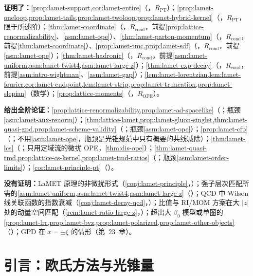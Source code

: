 \begin{tcolorbox}[enhanced,breakable,title=本章证明了什么／没有证明什么,fonttitle=\bfseries,
  colback=gray!3!white,colframe=gray!55!black,boxrule=0.6pt,arc=2pt,
  left=5pt,right=5pt,top=3pt,bottom=3pt,before skip=6pt,after skip=6pt]
\textbf{证明了：}\cref{prop:lamet-support,cor:lamet-entire}（\tagR，$R_{\mathrm{PT}}$）；\cref{prop:lamet-oneloop,prop:lamet-tails,prop:lamet-twoloop,prop:lamet-hybrid-kernel}（\tagR，$R_{\mathrm{PT}}$，限于所述阶）；\cref{thm:lamet-coordinate}（\tagR，$R_{\mathrm{cond}}$，前提\cref{prop:lattice-renormalizability}、\cref{asm:lamet-ope}）、\cref{thm:lamet-parton-momentum}（\tagR，$R_{\mathrm{cond}}$，前提\cref{thm:lamet-coordinate}）、\cref{prop:lamet-tmc,prop:lamet-sdf}（\tagR，$R_{\mathrm{cond}}$，前提\cref{asm:lamet-ope}）；\cref{thm:lamet-hadronic}（\tagR，$R_{\mathrm{cond}}$，前提\cref{asm:lamet-uniform,asm:lamet-twist4,asm:lamet-large-z}）；\cref{thm:lamet-exp-decay}（\tagR，$R_{\mathrm{cond}}$，前提\cref{asm:intro-wightman}、\cref{asm:lamet-gap}）；\cref{lem:lamet-lorentzian,lem:lamet-fourier,cor:lamet-endpoint,lem:lamet-strip,prop:lamet-truncation,prop:lamet-slepian}（数学）；\cref{prop:lattice-moments}（\tagR，$R_{\mathrm{OPE}}$）。\par
\textbf{给出全阶论证：}\cref{prop:lattice-renormalizability,prop:lamet-ad-spacelike}（\tagA；瓶颈\cref{asm:lamet-aux-renorm}）；\cref{thm:lattice-lamet,prop:lamet-gluon-singlet,thm:lamet-quasi-gpd,prop:lamet-scheme-validity}（\tagA；瓶颈\cref{asm:lamet-ope}）；\cref{prop:lamet-cfp}（\tagA；不用\cref{asm:lamet-ope}，瓶颈是光锥规范中只有概要的共线减除）；\cref{thm:lamet-lcs}（\tagA；只用定域流的微扰 OPE，\cref{thm:dis-ope}）；\cref{thm:lamet-quasi-tmd,prop:lattice-cs-kernel,prop:lamet-tmd-ratios}（\tagA；瓶颈\cref{asm:lamet-order-limits}）；\cref{cor:lamet-principle-pt}（\tagA）。\par
\textbf{没有证明：}LaMET 原理的非微扰形式（\cref{conj:lamet-principle}，\tagC）；强子层次匹配所需的\cref{asm:lamet-uniform,asm:lamet-twist4,asm:lamet-large-z}（\tagC）；QCD 中 Wilson 线关联函数的指数衰减（\cref{conj:lamet-decay-qcd}，\tagC）；比值与 RI/MOM 方案在大 $|z|$ 处的动量空间匹配（\cref{rem:lamet-ratio-large-z}，\tagC）；超出大 $\beta_0$ 模型或单圈的\cref{prop:lamet-lrr,prop:lamet-bvz,prop:lamet-polarized,prop:lamet-other-objects}（\tagP）；GPD 在 $x=\pm\xi$ 的情形（第~23~章）。
\end{tcolorbox}

\section{引言：欧氏方法与光锥量}\label{sec:lamet-intro}

